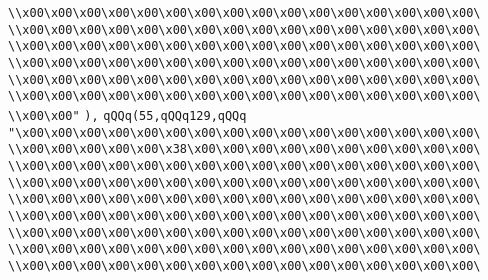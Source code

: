 \verb|\\x00\x00\x00\x00\x00\x00\x00\x00\x00\x00\x00\x00\x00\x00\x00\x00\|\newline
\verb|\\x00\x00\x00\x00\x00\x00\x00\x00\x00\x00\x00\x00\x00\x00\x00\x00\|\newline
\verb|\\x00\x00\x00\x00\x00\x00\x00\x00\x00\x00\x00\x00\x00\x00\x00\x00\|\newline
\verb|\\x00\x00\x00\x00\x00\x00\x00\x00\x00\x00\x00\x00\x00\x00\x00\x00\|\newline
\verb|\\x00\x00\x00\x00\x00\x00\x00\x00\x00\x00\x00\x00\x00\x00\x00\x00\|\newline
\verb|\\x00\x00\x00\x00\x00\x00\x00\x00\x00\x00\x00\x00\x00\x00\x00\x00\|\newline
\verb|\\x00\x00"|\newline
\verb|),|\newline
\verb|qQQq(55,qQQq129,qQQq|\newline
\verb|"\x00\x00\x00\x00\x00\x00\x00\x00\x00\x00\x00\x00\x00\x00\x00\x00\|\newline
\verb|\\x00\x00\x00\x00\x00\x38\x00\x00\x00\x00\x00\x00\x00\x00\x00\x00\|\newline
\verb|\\x00\x00\x00\x00\x00\x00\x00\x00\x00\x00\x00\x00\x00\x00\x00\x00\|\newline
\verb|\\x00\x00\x00\x00\x00\x00\x00\x00\x00\x00\x00\x00\x00\x00\x00\x00\|\newline
\verb|\\x00\x00\x00\x00\x00\x00\x00\x00\x00\x00\x00\x00\x00\x00\x00\x00\|\newline
\verb|\\x00\x00\x00\x00\x00\x00\x00\x00\x00\x00\x00\x00\x00\x00\x00\x00\|\newline
\verb|\\x00\x00\x00\x00\x00\x00\x00\x00\x00\x00\x00\x00\x00\x00\x00\x00\|\newline
\verb|\\x00\x00\x00\x00\x00\x00\x00\x00\x00\x00\x00\x00\x00\x00\x00\x00\|\newline
\verb|\\x00\x00\x00\x00\x00\x00\x00\x00\x00\x00\x00\x00\x00\x00\x00\x00\|\newline
